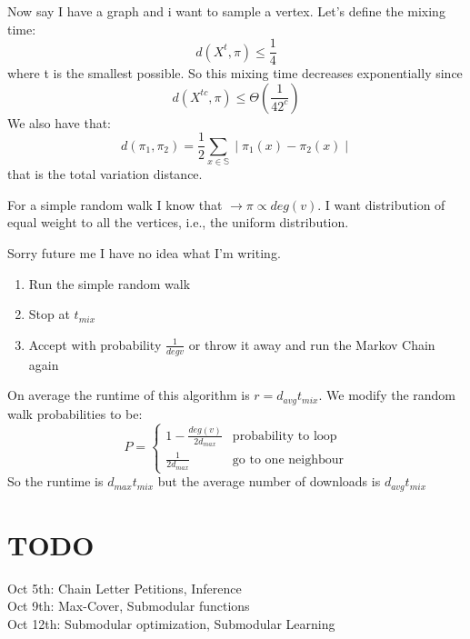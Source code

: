 \documentclass[]{article}
\begin{document}
Now say I have a graph and i want to sample a vertex. Let's define the mixing time: \[d\left(X^t, \pi \right) \leq \frac{1}{4} \] where t is the smallest possible. So this mixing time decreases exponentially since \[ d\left(X^{tc}, \pi \right) \leq \Theta\left(\frac{1}{42^c}\right)\] We also have that:
\[
d(\pi_1, \pi_2) = \frac{1}{2}\sum\limits_{x \in \mathbb{S}}\mid \pi_1(x) - \pi_2(x) \mid
\] that is the total variation distance.

For a simple random walk I know that $ \rightarrow \pi \propto deg(v) $. I want distribution of equal weight to all the vertices, i.e., the uniform distribution.

Sorry future me I have no idea what I'm writing.

\begin{enumerate}
	\item Run the simple random walk
	\item Stop at $ t_{mix} $
	\item Accept  with probability $\frac{1}{deg v} $ or throw it away and run the Markov Chain again
\end{enumerate}

On average the runtime of this algorithm is $ r = d_{avg} t_{mix} $. We modify the random walk probabilities to be:
\[
P = \begin{cases}
1 - \frac{deg(v)}{2d_{max}}&\text{probability to loop}\\
\frac{1}{2d_{max}}&\text{go to one neighbour}
\end{cases}
\]
So the runtime is $ d_{max}t_{mix} $ but the average number of downloads is $ d_{avg}t_{mix} $
\section{TODO}
Oct 5th:  Chain Letter Petitions, Inference\\
Oct 9th: Max-Cover, Submodular functions\\
Oct 12th: Submodular optimization, Submodular Learning\\
\end{document}
